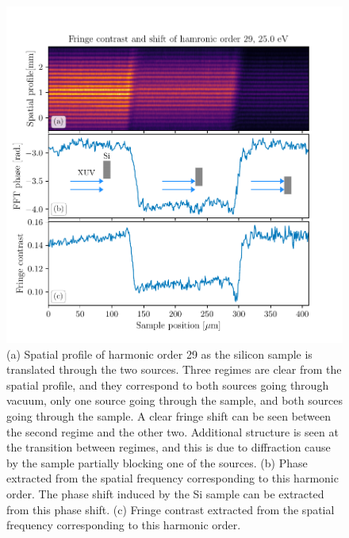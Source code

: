 \begin{figure}
	\centering
	\includegraphics[width=1.0\textwidth]{figures/refractive_index/spatialgram_fringe_shift_contrast.pdf}
	\caption[Spatial profile and fringe shift of a harmonic as sample is translated across the two XUV sources]{(a) Spatial profile of harmonic order 29 as the silicon sample is translated through the two sources. Three regimes are clear from the spatial profile, and they correspond to both sources going through vacuum, only one source going through the sample, and both sources going through the sample.  A clear fringe shift can be seen between the second regime and the other two.  Additional structure is seen at the transition between regimes, and this is due to diffraction cause by the sample partially blocking one of the sources. (b) Phase extracted from the spatial frequency corresponding to this harmonic order.  The phase shift induced by the Si sample can be extracted from this phase shift. (c) Fringe contrast extracted from the spatial frequency corresponding to this harmonic order.}
	\label{fig:harmonic_phase_shift}
\end{figure}
